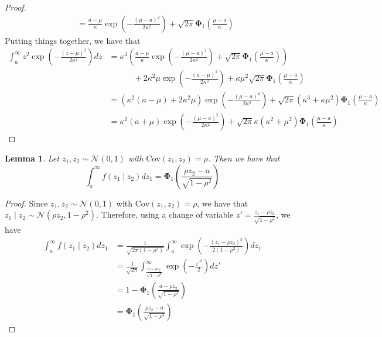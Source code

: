 \documentclass[10pt]{article} %
\newtheorem{lemma}[theorem]{Lemma}
\theoremstyle{definition}
\theoremstyle{plain}
\newcommand{\paren}[1]{\left(#1\right)}
\begin{document}
\begin{proof}
\begin{align*}
        & = \frac{a - \mu}{\kappa}\exp\paren{-\frac{\paren{\mu-a}^2}{2\kappa^2}} + \sqrt{2\pi}\bm{\Phi}_1\paren{\frac{\mu-a}{\kappa}}
    \end{align*}
    Putting things together, we have that
    \begin{align*}
        \int_{a}^\infty z^2\exp\paren{-\frac{\paren{z-\mu}^2}{2\kappa^2}}dz & = \kappa^3\paren{\frac{a - \mu}{\kappa}\exp\paren{-\frac{\paren{\mu-a}^2}{2\kappa^2}} + \sqrt{2\pi}\bm{\Phi}_1\paren{\frac{\mu-a}{\kappa}}}\\
        &\quad\quad\quad + 2\kappa^2\mu\exp\paren{-\frac{\paren{a-\mu}^2}{2\kappa^2}} + \kappa\mu^2\sqrt{2\pi}\bm{\Phi}_1\paren{\frac{\mu-a}{\kappa}}\\
        & = \paren{\kappa^2\paren{a - \mu} + 2\kappa^2\mu}\exp\paren{-\frac{\paren{\mu-a}^2}{2\kappa^2}} + \sqrt{2\pi}\paren{\kappa^3 + \kappa\mu^2}\bm{\Phi}_1\paren{\frac{\mu-a}{\kappa}}\\
        &  = \kappa^2\paren{a+\mu}\exp\paren{-\frac{\paren{\mu-a}^2}{2\kappa^2}} + \sqrt{2\pi}\kappa\paren{\kappa^2+\mu^2}\bm{\Phi}_1\paren{\frac{\mu-a}{\kappa}}
    \end{align*}
\end{proof}

\begin{lemma}
    \label{lem:cdf_forms}
    Let $z_1,z_2\sim\mathcal{N}\paren{0,1}$ with $\text{Cov}\paren{z_1, z_2} = \rho$. Then we have that
    \[
        \int_a^\infty f\paren{z_1\mid z_2}dz_1 = \bm{\Phi}_1\paren{\frac{\rho z_2 - a}{\sqrt{1-\rho^2}}}
    \]
\end{lemma}
\begin{proof}
    Since $z_1,z_2\sim\mathcal{N}\paren{0,1}$ with $\text{Cov}\paren{z_1, z_2} = \rho$, we have that $z_1\mid z_2 \sim\mathcal{N}\paren{\rho z_2, 1-\rho^2}$. Therefore, using a change of variable $z' = \frac{z_1 - \rho z_2}{\sqrt{1-\rho^2}}$, we have 
    \begin{align*}
        \int_a^\infty f\paren{z_1\mid z_2}dz_1 & = \frac{1}{\sqrt{2\pi\paren{1-\rho^2}}}\int_a^\infty\exp\paren{-\frac{\paren{z_1-\rho z_2}^2}{2\paren{1-\rho^2}}}dz_1\\
        & = \frac{1}{\sqrt{2\pi}}\int_{\frac{a - \rho z_2}{\sqrt{1-\rho^2}}}^\infty\exp\paren{-\frac{z'^2}{2}}dz'\\
        & = 1 - \bm{\Phi}_1\paren{\frac{a-\rho z_2}{\sqrt{1-\rho^2}}}\\
        & = \bm{\Phi}_1\paren{\frac{\rho z_2 - a}{\sqrt{1-\rho^2}}}
    \end{align*}
\end{proof}
\end{document}
